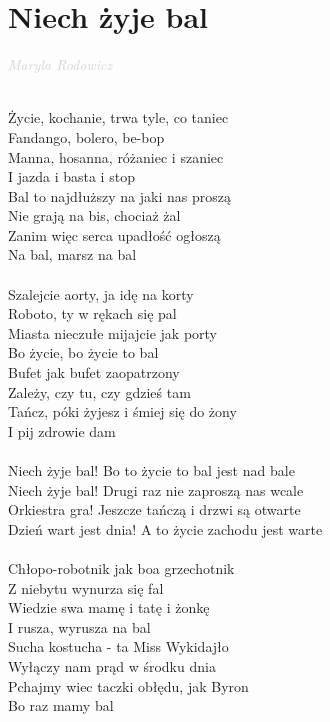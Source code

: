 \documentclass[a5paper, 10pt]{book}
\begin{document}
\section{Niech żyje bal}\textcolor{lightgray}{\textit{Maryla Rodowicz}}\\~\\
\begin{minipage}[t]{0.8\textwidth}
  Życie, kochanie, trwa tyle, co taniec\\
  Fandango, bolero, be-bop\\
  Manna, hosanna, różaniec i szaniec\\
  I jazda i basta i stop\\
  Bal to najdłuższy na jaki nas proszą\\
  Nie grają na bis, chociaż żal\\
  Zanim więc serca upadłość ogłoszą\\
  Na bal, marsz na bal\\
  \\
  Szalejcie aorty, ja idę na korty\\
  Roboto, ty w rękach się pal\\
  Miasta nieczułe mijajcie jak porty\\
  Bo życie, bo życie to bal\\
  Bufet jak bufet zaopatrzony\\
  Zależy, czy tu, czy gdzieś tam\\
  Tańcz, póki żyjesz i śmiej się do żony\\
  I pij zdrowie dam\\
  \\
  \hspace*{5mm}Niech żyje bal! Bo to życie to bal jest nad bale\\
  \hspace*{5mm}Niech żyje bal! Drugi raz nie zaproszą nas wcale\\
  \hspace*{5mm}Orkiestra gra! Jeszcze tańczą i drzwi są otwarte\\
  \hspace*{5mm}Dzień wart jest dnia! A to życie zachodu jest warte\\
  \\
  Chłopo-robotnik jak boa grzechotnik\\
  Z niebytu wynurza się fal\\
  Wiedzie swa mamę i tatę i żonkę\\
  I rusza, wyrusza na bal\\
  Sucha kostucha - ta Miss Wykidajło\\
  Wyłączy nam prąd w środku dnia\\
  Pchajmy wiec taczki obłędu, jak Byron\\
  Bo raz mamy bal\\
\end{minipage}
\end{document}
